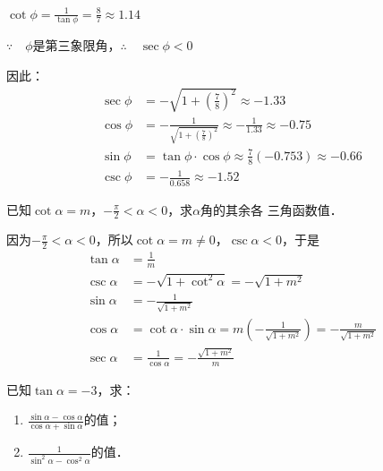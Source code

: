 \begin{solution}
$\cot\phi=\frac{1}{\tan\phi}=\frac{8}{7}\approx 1.14$

$\because\quad \phi$是第三象限角，$\therefore\quad \sec\phi<0$

因此：
\[\begin{split}
    \sec\phi&=-\sqrt{1+\left(\frac{7}{8}\right)^2}\approx -1.33\\
    \cos\phi&=-\frac{1}{\sqrt{1+\left(\frac{7}{8}\right)^2}}\approx-\frac{1}{1.33}\approx -0.75\\
    \sin\phi&=\tan\phi\cdot \cos\phi\approx \frac{7}{8}(-0.753)\approx -0.66\\
    \csc\phi&=-\frac{1}{0.658}\approx -1.52
\end{split}\]
\end{solution}



\begin{example}
    已知$\cot\alpha=m$，$-\frac{\pi}{2}<\alpha<0$，求$\alpha$角的其余各
三角函数值．
\end{example}

\begin{solution}
因为$-\frac{\pi}{2}<\alpha<0$，所以$\cot\alpha=m\ne 0$，$\csc\alpha<0$，于是
\[\begin{split}
    \tan\alpha&=\frac{1}{m}\\
\csc\alpha&=-\sqrt{1+\cot^2\alpha}=-\sqrt{1+m^2}\\
\sin\alpha&=-\frac{1}{\sqrt{1+m^2}}\\
\cos\alpha&=\cot\alpha\cdot \sin\alpha=m\left(-\frac{1}{\sqrt{1+m^2}}\right)=-\frac{m}{\sqrt{1+m^2}}\\
\sec\alpha&=\frac{1}{\cos\alpha}=-\frac{\sqrt{1+m^2}}{m}
\end{split}\]
\end{solution}

\begin{example}
    已知$\tan\alpha=-3$，求：
    \begin{enumerate}
        \item $\frac{\sin\alpha-\cos\alpha}{\cos\alpha+\sin\alpha}$的值；
        \item $\frac{1}{\sin^2\alpha-\cos^2\alpha}$的值．
    \end{enumerate}
\end{example}

